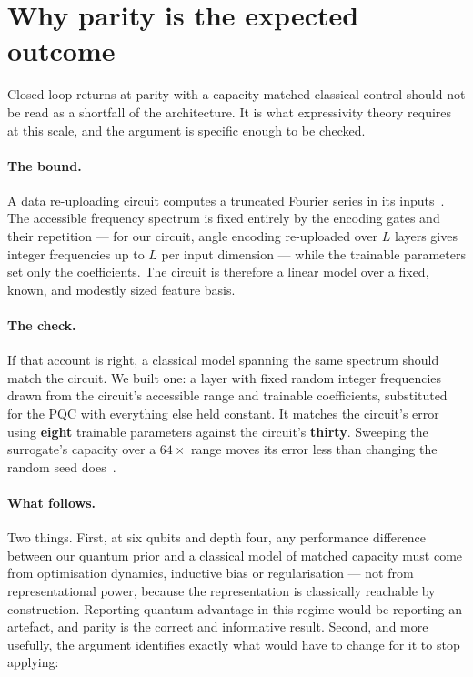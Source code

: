 \documentclass[11pt,onecolumn]{article}
\begin{document}
\section{Why parity is the expected outcome}\label{sec:parity}
Closed-loop returns at parity with a capacity-matched classical control
should not be read as a shortfall of the architecture. It is what
expressivity theory requires at this scale, and the argument is specific
enough to be checked.

\paragraph{The bound.}
A data re-uploading circuit computes a truncated Fourier series in its
inputs~\cite{schuld2021}. The accessible frequency spectrum is fixed
entirely by the encoding gates and their repetition --- for our circuit,
angle encoding re-uploaded over $L$ layers gives integer frequencies up
to $L$ per input dimension --- while the trainable parameters set only
the coefficients. The circuit is therefore a linear model over a fixed,
known, and modestly sized feature basis.

\paragraph{The check.}
If that account is right, a classical model spanning the same spectrum
should match the circuit. We built one: a layer with fixed random
integer frequencies drawn from the circuit's accessible range and
trainable coefficients, substituted for the PQC with everything else
held constant. It matches the circuit's error using \textbf{eight}
trainable parameters against the circuit's \textbf{thirty}. Sweeping the
surrogate's capacity over a $64\times$ range moves its error less than
changing the random seed does~\cite{papera}.

\paragraph{What follows.}
Two things. First, at six qubits and depth four, any performance
difference between our quantum prior and a classical model of matched
capacity must come from optimisation dynamics, inductive bias or
regularisation --- not from representational power, because the
representation is classically reachable by construction. Reporting
quantum advantage in this regime would be reporting an artefact, and
parity is the correct and informative result. Second, and more usefully,
the argument identifies exactly what would have to change for it to
stop applying:
\end{document}
